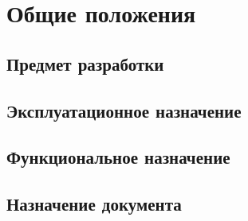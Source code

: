 \section{Общие положения}
\subsection{Предмет разработки}

\subsection{Эксплуатационное назначение}

\subsection{Функциональное назначение}

\subsection{Назначение документа}
